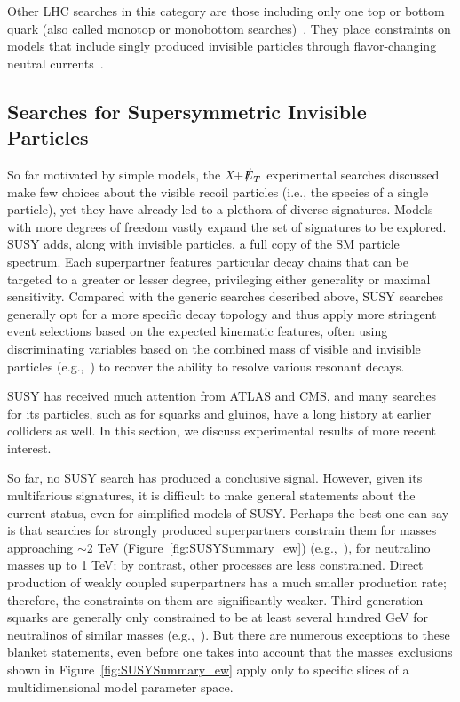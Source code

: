 \documentclass{ar-1col}
\newcommand{\IP}{invisible particle}
\newcommand{\MET}{\ensuremath{\slashed{E}_T}\xspace}
\begin{document}
Other LHC searches in this category are those including only
one top or bottom quark (also called monotop or monobottom
searches)~\cite{Sirunyan:2018gka, Aad:2014wza}. They place
constraints on models that include singly produced {\IP}s through
flavor-changing neutral currents~\cite{Boucheneb:2014wza}.

\subsection{Searches for Supersymmetric Invisible Particles}\label{sec:results_SUSYSearches}

So far motivated by simple models, the \textit{X}+\MET experimental
searches discussed make few choices about the visible recoil
particles (i.e., the species of a single particle), yet they have
already led to a plethora of diverse signatures. Models with more degrees of freedom vastly expand the set of
signatures to be explored. SUSY adds, along with
{\IP}s, a full copy of the SM particle
spectrum. Each superpartner features particular decay chains that
can be targeted to a greater or lesser degree, privileging either
generality or maximal sensitivity. Compared with the generic
searches described above, SUSY searches generally opt for a more specific
decay topology and thus apply more stringent event selections
based on the expected kinematic features, often using
discriminating variables based on the combined mass of visible and
invisible particles (e.g.,~) to recover
the ability to resolve various resonant decays.

SUSY has received much attention from ATLAS and CMS, and many
searches for its particles, such as for squarks and gluinos, have
a long history at earlier colliders as well. In this section, we
discuss experimental results of more recent interest.

So far, no SUSY search has produced a conclusive signal. However,
given its multifarious signatures, it is difficult to make general
statements about the current status, even for simplified models of
SUSY. Perhaps the best one can say is that searches for
strongly produced superpartners constrain them for masses
approaching $\sim$2 TeV (Figure~\ref{fig:SUSYSummary_ew})
(e.g.,~), for neutralino
masses up to 1 TeV; by contrast, other processes are
less constrained. Direct production of weakly coupled
superpartners has a much smaller production rate; therefore, the
constraints on them are significantly weaker. Third-generation
squarks are generally only constrained to be at least several
hundred GeV for neutralinos of similar masses (e.g.,~). But there are
numerous exceptions to these blanket statements, even before one
takes into account that the masses exclusions shown in Figure~\ref{fig:SUSYSummary_ew} 
apply only to specific slices of a multidimensional model parameter
space.
\end{document}
